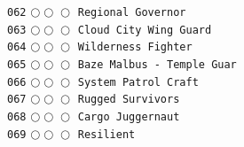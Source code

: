 \documentclass[a4paper,landscape]{article}
\begin{document}
\begin{multicols*}{5}
\texttt{062} \(\bigcirc\!\bigcirc\!\bigcirc\)  \texttt{Regional Governor} \vspace{-0.3mm}\\ 
\texttt{063} \(\bigcirc\!\bigcirc\!\bigcirc\)  \texttt{Cloud City Wing Guard} \vspace{-0.3mm}\\ 
\texttt{064} \(\bigcirc\!\bigcirc\!\bigcirc\)  \texttt{Wilderness Fighter} \vspace{-0.3mm}\\ 
\texttt{065} \(\bigcirc\!\bigcirc\!\bigcirc\)  \texttt{Baze Malbus - Temple Guar} \vspace{-0.3mm}\\ 
\texttt{066} \(\bigcirc\!\bigcirc\!\bigcirc\)  \texttt{System Patrol Craft} \vspace{-0.3mm}\\ 
\texttt{067} \(\bigcirc\!\bigcirc\!\bigcirc\)  \texttt{Rugged Survivors} \vspace{-0.3mm}\\ 
\texttt{068} \(\bigcirc\!\bigcirc\!\bigcirc\)  \texttt{Cargo Juggernaut} \vspace{-0.3mm}\\ 
\texttt{069} \(\bigcirc\!\bigcirc\!\bigcirc\)  \texttt{Resilient} \vspace{-0.3mm}\\ 

\end{multicols*}
\end{document}
